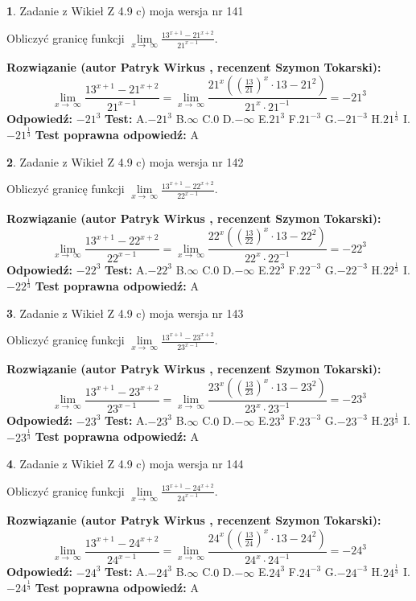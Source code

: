 \documentclass[12pt, a4paper]{article}
\theoremstyle{definition} %
\newtheorem{zad}{}
\newcommand{\zadStart}[1]{\begin{zad}#1\newline}
\newcommand{\zadStop}{\end{zad}}
\newcommand{\rozwStart}[2]{\noindent \textbf{Rozwiązanie (autor #1 , recenzent #2): }\newline}
\newcommand{\rozwStop}{\newline}
\newcommand{\odpStart}{\noindent \textbf{Odpowiedź:}\newline}
\newcommand{\odpStop}{\newline}
\newcommand{\testStart}{\noindent \textbf{Test:}\newline}
\newcommand{\testStop}{\newline}
\newcommand{\kluczStart}{\noindent \textbf{Test poprawna odpowiedź:}\newline}
\newcommand{\kluczStop}{\newline}
\begin{document}
\zadStart{Zadanie z Wikieł Z 4.9 c) moja wersja nr 141}


Obliczyć granicę funkcji  $\lim\limits_{x\to\ \infty}\frac{13^{x+1}-21^{x+2}}{21^{x-1}}$.
\zadStop
\rozwStart{Patryk Wirkus}{Szymon Tokarski}
$$\lim\limits_{x\to\ \infty}\frac{13^{x+1}-21^{x+2}}{21^{x-1}}=\lim\limits_{x\to\ \infty}\frac{21^{x}((\frac{13}{21})^{x}\cdot 13 -21^{2})}{21^{x}\cdot 21^{-1}} = -21^{3}$$
\rozwStop
\odpStart
$-21^{3}$
\odpStop
\testStart
A.$-21^{3}$ B.$\infty$ C.$0$ D.$-\infty$ E.$21^{3}$
F.$21^{-3}$ G.$-21^{-3}$
H.$21^{\frac{1}{3}}$
I.$-21^{\frac{1}{3}}$
\testStop
\kluczStart
A
\kluczStop



\zadStart{Zadanie z Wikieł Z 4.9 c) moja wersja nr 142}


Obliczyć granicę funkcji  $\lim\limits_{x\to\ \infty}\frac{13^{x+1}-22^{x+2}}{22^{x-1}}$.
\zadStop
\rozwStart{Patryk Wirkus}{Szymon Tokarski}
$$\lim\limits_{x\to\ \infty}\frac{13^{x+1}-22^{x+2}}{22^{x-1}}=\lim\limits_{x\to\ \infty}\frac{22^{x}((\frac{13}{22})^{x}\cdot 13 -22^{2})}{22^{x}\cdot 22^{-1}} = -22^{3}$$
\rozwStop
\odpStart
$-22^{3}$
\odpStop
\testStart
A.$-22^{3}$ B.$\infty$ C.$0$ D.$-\infty$ E.$22^{3}$
F.$22^{-3}$ G.$-22^{-3}$
H.$22^{\frac{1}{3}}$
I.$-22^{\frac{1}{3}}$
\testStop
\kluczStart
A
\kluczStop



\zadStart{Zadanie z Wikieł Z 4.9 c) moja wersja nr 143}


Obliczyć granicę funkcji  $\lim\limits_{x\to\ \infty}\frac{13^{x+1}-23^{x+2}}{23^{x-1}}$.
\zadStop
\rozwStart{Patryk Wirkus}{Szymon Tokarski}
$$\lim\limits_{x\to\ \infty}\frac{13^{x+1}-23^{x+2}}{23^{x-1}}=\lim\limits_{x\to\ \infty}\frac{23^{x}((\frac{13}{23})^{x}\cdot 13 -23^{2})}{23^{x}\cdot 23^{-1}} = -23^{3}$$
\rozwStop
\odpStart
$-23^{3}$
\odpStop
\testStart
A.$-23^{3}$ B.$\infty$ C.$0$ D.$-\infty$ E.$23^{3}$
F.$23^{-3}$ G.$-23^{-3}$
H.$23^{\frac{1}{3}}$
I.$-23^{\frac{1}{3}}$
\testStop
\kluczStart
A
\kluczStop



\zadStart{Zadanie z Wikieł Z 4.9 c) moja wersja nr 144}


Obliczyć granicę funkcji  $\lim\limits_{x\to\ \infty}\frac{13^{x+1}-24^{x+2}}{24^{x-1}}$.
\zadStop
\rozwStart{Patryk Wirkus}{Szymon Tokarski}
$$\lim\limits_{x\to\ \infty}\frac{13^{x+1}-24^{x+2}}{24^{x-1}}=\lim\limits_{x\to\ \infty}\frac{24^{x}((\frac{13}{24})^{x}\cdot 13 -24^{2})}{24^{x}\cdot 24^{-1}} = -24^{3}$$
\rozwStop
\odpStart
$-24^{3}$
\odpStop
\testStart
A.$-24^{3}$ B.$\infty$ C.$0$ D.$-\infty$ E.$24^{3}$
F.$24^{-3}$ G.$-24^{-3}$
H.$24^{\frac{1}{3}}$
I.$-24^{\frac{1}{3}}$
\testStop
\kluczStart
A
\kluczStop
\end{document}
